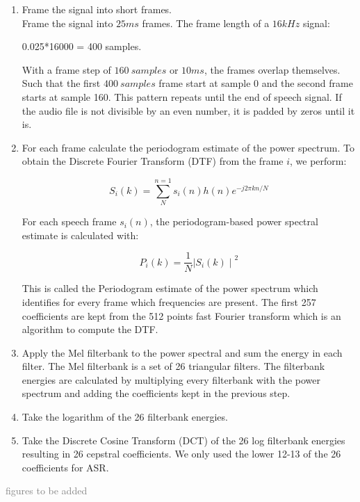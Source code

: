 \begin{enumerate}[label=\arabic*.]
  \item Frame the signal into short frames.\\
  
  Frame the signal into $25ms$ frames. The frame length of a $16kHz$ signal:
  \begin{center} 
    0.025*16000 = 400 samples.
  \end{center}
  With a frame step of $160\ samples$ or $10ms$, the frames overlap themselves.
  Such that the first $400\ samples$ frame start at sample 0 and the second
  frame starts at sample 160. This pattern repeats until the end of speech
  signal. If the audio file is not divisible by an even number, it is padded by
  zeros until it is.\\
  \item For each frame calculate the periodogram estimate of the power spectrum.
    To obtain the Discrete Fourier Transform (DTF) from the frame $i$, we
    perform:
    \begin{center}
      \[S_{i}(k) = \sum_{N}^{n=1}s_i(n)h(n)e^{-j2\pi kn/N}\]
    \end{center}
    For each speech frame $s_{i}(n)$, the periodogram-based power spectral
    estimate is calculated with:
    \begin{center}
      \[P_{i}(k)=\frac{1}{N}{\mid{S_{i}(k)}\mid}^{2}\]
    \end{center}
  This is called the Periodogram estimate of the power spectrum which identifies
  for every frame which frequencies are present. The first 257 coefficients are
  kept from the 512 points fast Fourier transform which is an algorithm to
  compute the DTF.\\
  \item Apply the Mel filterbank to the power spectral and sum the energy in
    each filter. The Mel filterbank is a set of 26 triangular filters. The
    filterbank energies are calculated by multiplying every filterbank with the
    power spectrum and adding the coefficients kept in the previous step.\\
  \item Take the logarithm of the 26 filterbank energies.\\
  \item Take the Discrete Cosine Transform (DCT) of the 26 log filterbank
    energies resulting in 26 cepstral coefficients. We only used the lower 12-13
    of the 26 coefficients for ASR.\\
\end{enumerate}

\textcolor{gray}{figures to be added}
